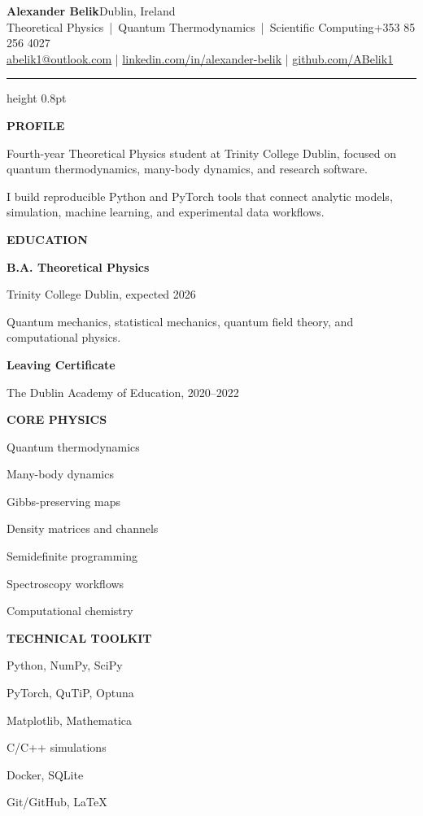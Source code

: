 \documentclass[10pt,a4paper]{article}
\newcommand{\sectiontitle}[1]{%
  \vspace{9pt}
  {\small\bfseries\color{accent}\MakeUppercase{#1}}\par
  \vspace{2.7pt}{\color{rule}\hrule height 0.55pt}\vspace{5.2pt}
}
\newcommand{\sideitem}[2]{%
{\bfseries #1}\par{\small\color{muted}#2}\par\vspace{6pt}
}
\begin{document}
\fontsize{10.15}{12.25}\selectfont
\color{ink}

{\LARGE\bfseries Alexander Belik}\hfill{\small Dublin, Ireland}\\[-1pt]
{\large\color{accent} Theoretical Physics \,|\, Quantum Thermodynamics \,|\, Scientific Computing}\hfill{\small +353 85 256 4027}\\[3pt]
{\small
\href{mailto:abelik1@outlook.com}{abelik1@outlook.com}
\quad|\quad
\href{https://www.linkedin.com/in/alexander-belik/}{linkedin.com/in/alexander-belik}
\quad|\quad
\href{https://github.com/ABelik1}{github.com/ABelik1}
}
\vspace{7pt}

{\color{rule}\hrule height 0.8pt}
\vspace{8pt}

\begin{minipage}[t][0.835\textheight][t]{0.315\linewidth}
\raggedright

\sectiontitle{Profile}
Fourth-year Theoretical Physics student at Trinity College Dublin, focused on quantum thermodynamics, many-body dynamics, and research software.
\vspace{4pt}

I build reproducible Python and PyTorch tools that connect analytic models, simulation, machine learning, and experimental data workflows.

\sectiontitle{Education}
\sideitem{B.A. Theoretical Physics}{Trinity College Dublin, expected 2026}
{\small Quantum mechanics, statistical mechanics, quantum field theory, and computational physics.}\par\vspace{5pt}
\sideitem{Leaving Certificate}{The Dublin Academy of Education, 2020--2022}

\sectiontitle{Core Physics}
{\small
Quantum thermodynamics\par
Many-body dynamics\par
Gibbs-preserving maps\par
Density matrices and channels\par
Semidefinite programming\par
Spectroscopy workflows\par
Computational chemistry\par
}

\sectiontitle{Technical Toolkit}
{\small
Python, NumPy, SciPy\par
PyTorch, QuTiP, Optuna\par
Matplotlib, Mathematica\par
C/C++ simulations\par
Docker, SQLite\par
Git/GitHub, LaTeX\par
}


\end{minipage}
\end{document}
